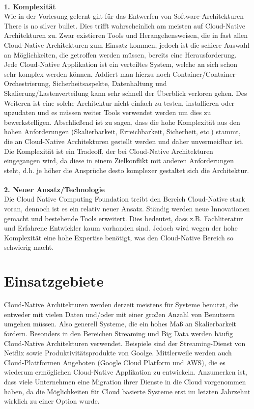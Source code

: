 \\
\textbf{1. Komplexität}\\
Wie in der Vorlesung gelernt gilt für das Entwerfen von Software-Architekturen \glqq There is no silver bullet\grqq{}. Dies trifft wahrscheinlich am meisten auf Cloud-Native Architekturen zu. Zwar existieren Tools und Herangehensweisen, die in fast allen Cloud-Native Architekturen zum Einsatz kommen, jedoch ist die schiere Auswahl an Möglichkeiten, die getroffen werden müssen, bereits eine Herausforderung. 
Jede Cloud-Native Applikation ist ein verteiltes System, welche an sich schon sehr komplex werden können. Addiert man hierzu noch Container/Container-Orchestrierung, Sicherheitsaspekte, Datenhaltung und Skalierung/Lastenverteilung kann sehr schnell der Überblick verloren gehen. Des Weiteren ist eine solche Architektur nicht einfach zu testen, installieren oder upzudaten und es müssen weiter Tools verwendet werden um dies zu bewerkstelligen.
Abschließend ist zu sagen, dass die hohe Komplexität aus den hohen Anforderungen (Skalierbarkeit, Erreichbarkeit, Sicherheit, etc.) stammt, die an Cloud-Native Architekturen gestellt werden und daher unvermeidbar ist. Die Komplexität ist ein Tradeoff, der bei Cloud-Native Architekturen eingegangen wird, da diese in einem Zielkonflikt mit anderen Anforderungen steht, d.h. je höher die Ansprüche desto komplexer gestaltet sich die Architektur.\\
\\
\textbf{2. Neuer Ansatz/Technologie}\\
Die Cloud Native Computing Foundation treibt den Bereich Cloud-Native stark voran, dennoch ist es ein relativ neuer Ansatz. Ständig werden neue Innovationen gemacht und bestehende Tools erweitert. Dies bedeutet, dass z.B. Fachliteratur und Erfahrene Entwickler kaum vorhanden sind. Jedoch wird wegen der hohe Komplexität eine hohe Expertise benötigt, was den Cloud-Native Bereich so schwierig macht.

\section{Einsatzgebiete}
Cloud-Native Architekturen werden derzeit meistens für Systeme benutzt, die entweder mit vielen Daten und/oder mit einer großen Anzahl von Benutzern umgehen müssen. Also generell Systeme, die ein hohes Maß an Skalierbarkeit fordern. Besonders in den Bereichen Streaming und Big Data werden häufig Cloud-Native Architekturen verwendet. 
Beispiele sind der Streaming-Dienst von Netflix sowie Produktivitätsprodukte von Goolge. Mittlerweile werden auch Cloud-Plattformen Angeboten (Google Cloud Platform und AWS), die es wiederum ermöglichen Cloud-Native Applikation zu entwickeln.
Anzumerken ist, dass viele Unternehmen eine Migration ihrer Dienste in die Cloud vorgenommen haben, da die Möglichkeiten für Cloud basierte Systeme erst im letzten Jahrzehnt wirklich zu einer Option wurde.